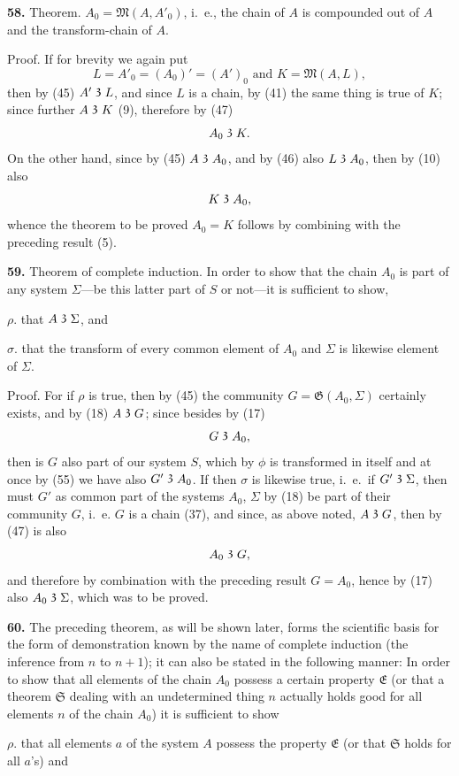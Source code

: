 \documentclass[oneside]{book}
\newcommand\partof{\mathrel{\raisebox{0.45ex}{$\mathfrak{3}$}}}   %
\newcommand\mypara{\medskip\textbf}
\begin{document}
\mypara{58.} Theorem. $A_0=\mathfrak{M}(A, A'_0)$, i.~e., the chain of
$A$ is compounded out of $A$ and the transform-chain
of $A$.

Proof. If for brevity we again put
\[
L=A'_0 =(A_0)'=(A')_0 \text{\ and\ } K=\mathfrak{M}(A, L),
\]
then by (45) $A' \partof L$, and since $L$ is a chain, by (41)
the same thing is true of $K$; since further $A \partof K$ (9),
therefore by (47)
\[
A_0 \partof K.
\]
On the other hand, since by (45) $A \partof A_0$, and by (46)
also $L \partof A_0$, then by (10) also
\[
K \partof A_0,
\]
whence the theorem to be proved $A_0=K$ follows by
combining with the preceding result (5).

\mypara{59.} Theorem of complete induction. In order to
show that the chain $A_0$ is part of any system $\Sigma$---be
this latter part of $S$ or not---it is sufficient to show,

$\rho$.  that $A \partof \Sigma$, and


$\sigma$. that the transform of every common element of
$A_0$ and $\Sigma$ is likewise element of $\Sigma$.

Proof. For if $\rho$ is true, then by (45) the community
$G=\mathfrak{G}(A_0,\Sigma)$ certainly exists, and by (18)
$A \partof G$; since besides by (17)
\[
G \partof A_0,
\]
then is $G$ also part of our system $S$, which by $\phi$ is
transformed in itself and at once by (55) we have also
$G' \partof A_0$. If then $\sigma$ is likewise true, i.~e.\ if $G' \partof \Sigma$, then
must $G'$ as common part of the systems $A_0$, $\Sigma$ by (18)
be part of their community $G$, i.~e. $G$ is a chain (37),
and since, as above noted, $A \partof G$, then by (47) is also
\[
A_0 \partof G,
\]
and therefore by combination with the preceding result
$G=A_0$, hence by (17) also $A_0 \partof \Sigma$, which was to
be proved.

\mypara{60.} The preceding theorem, as will be shown later,
forms the scientific basis for the form of demonstration
known by the name of complete induction (the
inference from $n$ to $n+1$); it can also be stated in
the following manner: In order to show that all elements
of the chain $A_0$ possess a certain property $\mathfrak{E}$
(or that a theorem $\mathfrak{S}$ dealing with an undetermined
thing $n$ actually holds good for all elements $n$ of the
chain $A_0$) it is sufficient to show

$\rho$. that all elements $a$ of the system $A$ possess the
property $\mathfrak{E}$ (or that $\mathfrak{S}$ holds for all $a$'s) and
\end{document}
